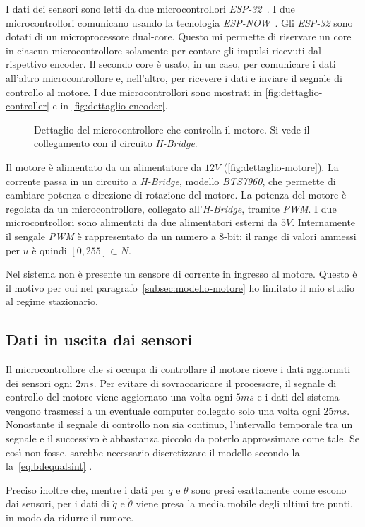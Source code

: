 I dati dei sensori sono letti da due microcontrollori \emph{ESP-32}~\cite{esp32}.
I due microcontrollori comunicano usando la tecnologia \emph{ESP-NOW}~\cite{espnow}.
Gli \emph{ESP-32} sono dotati di un microprocessore dual-core. Questo mi
permette di riservare un core in ciascun microcontrollore solamente per contare
gli impulsi ricevuti dal rispettivo encoder. Il secondo core è usato, in un caso,
per comunicare i dati all'altro microcontrollore e, nell'altro, per ricevere i dati
e inviare il segnale di controllo al motore. I due microcontrollori sono mostrati
in \autoref{fig:dettaglio-controller} e in \autoref{fig:dettaglio-encoder}.

\begin{figure}[h]
    \centering
    \caption[Dettaglio controller]{Dettaglio
    del microcontrollore che controlla il motore.
    Si vede il collegamento con il circuito
    \emph{H-Bridge}.}
    \label{fig:dettaglio-controller}
\end{figure}

Il motore è alimentato da un alimentatore da $12V$ (\autoref{fig:dettaglio-motore}).
La corrente passa in un circuito a \emph{H-Bridge}, modello \emph{BTS7960},
che permette di cambiare potenza e direzione di rotazione del motore.
La potenza del motore è regolata da un microcontrollore, collegato all'\emph{H-Bridge}, tramite \emph{PWM}\footnotemark. I due microcontrollori sono alimentati da due alimentatori esterni da $5V$. Internamente il sengale \emph{PWM} è rappresentato da un
numero a $8$-bit; il range di valori ammessi per $u$ è quindi $[0, 255] \subset N$.



Nel sistema non è presente un sensore di corrente in ingresso al motore.
Questo è il motivo per cui nel paragrafo~\ref{subsec:modello-motore} ho limitato
il mio studio al regime stazionario.

\subsection{Dati in uscita dai sensori}
Il microcontrollore che si occupa di controllare il motore riceve i dati
aggiornati dei sensori ogni $2ms$.
Per evitare di sovraccaricare il processore, il segnale di controllo
del motore viene aggiornato una volta ogni $5ms$ e i dati del sistema vengono
trasmessi a un eventuale computer collegato solo una volta ogni $25ms$.
Nonostante il segnale di controllo non sia continuo, l'intervallo temporale
tra un segnale e il successivo è abbastanza piccolo da poterlo approssimare come
tale.
Se così non fosse, sarebbe necessario discretizzare
il modello secondo la la~\eqref{eq:bdequalsint} .

Preciso inoltre che, mentre i dati per $q$ e $\theta$ sono presi esattamente
come escono dai sensori, per i dati di $\dot q$ e $\dot \theta$ viene presa
la media mobile degli ultimi tre punti, in modo da ridurre il rumore.
